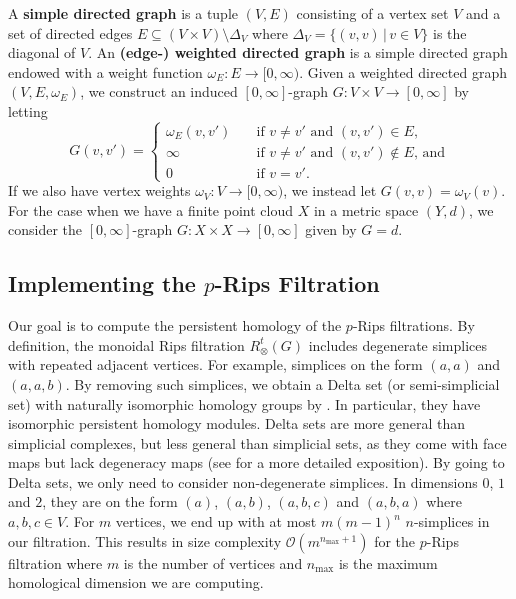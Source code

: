 \documentclass[a4paper,11pt]{article}
\theoremstyle{remark}
\begin{document}
A \textbf{simple directed graph} is a tuple $(V,E)$ consisting of a vertex set $V$ and a set of directed edges $E\subseteq (V\times V)\setminus\Delta_V$ where $\Delta_V=\{(v,v)\,|\, v\in V\}$ is the diagonal of $V$. An \textbf{(edge-) weighted directed graph} is a simple directed graph endowed with a weight function $\omega_E\colon E\to [0,\infty)$. Given a weighted directed graph $(V,E,\omega_E)$, we construct an induced $[0,\infty]$-graph $G\colon V\times V\to[0, \infty]$ by letting
\begin{equation*}
G(v, v') = 
     \begin{cases}
     \omega_E(v,v') &\quad\text{if }v\neq v'\text{ and }(v,v')\in E\text{,}\\
     \infty &\quad\text{if }v\neq v'\text{ and }(v,v')\notin E\text{, and}\\
     0 &\quad\text{if } v=v'.
     \end{cases}
\end{equation*}
If we also have vertex weights $\omega_V\colon V\to [0,\infty)$, we instead let $G(v,v)=\omega_V(v)$. For the case when we have a finite point cloud $X$ in a metric space $(Y, d)$, we consider the $[0,\infty]$-graph $G\colon X\times X\to[0,\infty]$ given by $G=d$.

\subsection{Implementing the \texorpdfstring{$p$}{p}-Rips Filtration}\label{sec:implementing_p_rips_filtration}

Our goal is to compute the persistent homology of the $p$-Rips filtrations. By definition, the monoidal Rips filtration $R_\otimes^t(G)$ includes degenerate simplices with repeated adjacent vertices. For example, simplices on the form $(a,a)$ and $(a,a,b)$. By removing such simplices, we obtain a Delta set (or semi-simplicial set) with naturally isomorphic homology groups by \cite[Theorem~2.1~and~2.4]{goerss2009simplicial}. In particular, they have isomorphic persistent homology modules. Delta sets are more general than simplicial complexes, but less general than simplicial sets, as they come with face maps but lack degeneracy maps (see \cite[Section~2.4]{friedman2008elementary} for a more detailed exposition). By going to Delta sets, we only need to consider non-degenerate simplices. In dimensions $0$, $1$ and $2$, they are on the form $(a)$, $(a,b)$, $(a,b,c)$ and $(a,b,a)$ where $a,b,c\in V$. For $m$ vertices, we end up with at most $m(m-1)^n$ $n$-simplices in our filtration. This results in size complexity $\mathcal{O}(m^{n_{\text{max}}+1})$ for the $p$-Rips filtration where $m$ is the number of vertices and $n_{\text{max}}$ is the maximum homological dimension we are computing.
\end{document}

